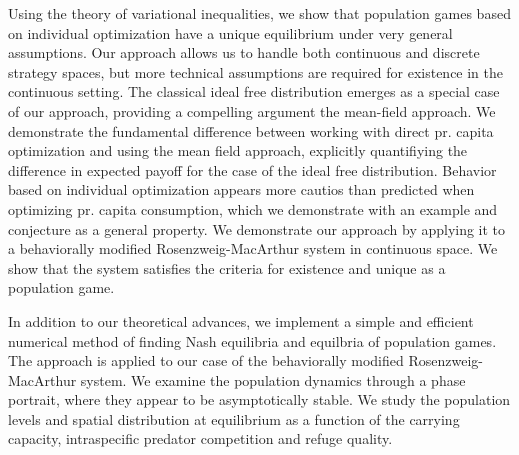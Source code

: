 Using the theory of variational inequalities, we show that population games based on individual optimization have a unique equilibrium under very general assumptions. Our approach allows us to handle both continuous and discrete strategy spaces, but more technical assumptions are required for existence in the continuous setting. The classical ideal free distribution emerges as a special case of our approach, providing a compelling argument the mean-field approach. We demonstrate the fundamental difference between working with direct pr. capita optimization and using the mean field approach, explicitly quantifiying the difference in expected payoff for the case of the ideal free distribution. Behavior based on individual optimization appears more cautios than predicted when optimizing pr. capita consumption, which we demonstrate with an example and conjecture as a general property. We demonstrate our approach by applying it to a behaviorally modified Rosenzweig-MacArthur system in continuous space. We show that the system satisfies the criteria for existence and unique as a population game.


In addition to our theoretical advances, we implement a simple and efficient numerical method of finding Nash equilibria and equilbria of population games. The approach is applied to our case of the behaviorally modified Rosenzweig-MacArthur system. We examine the population dynamics through a phase portrait, where they appear to be asymptotically stable. We study the population levels and spatial distribution at equilibrium as a function of the carrying capacity, intraspecific predator competition and refuge quality.




